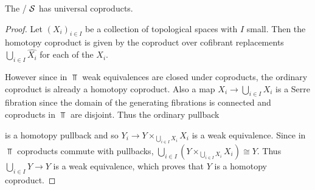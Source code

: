 \begin{lemma}
    The \inftycat/ $\mathcal{S}$ has universal coproducts.
    \begin{proof}
        	Let $\left(X_i\right)_{i\in I}$ be a collection of topological spaces with $I$ small. 
            Then the homotopy coproduct is given by the coproduct over cofibrant replacements $\bigcup\limits_{i\in I}\widehat{X_i}$ for each of the $X_i$.

            However since in $\Top$ weak equivalences are closed under coproducts, the ordinary coproduct is already a homotopy coproduct.
            Also a map $X_i\to\bigcup\limits_{i\in I} X_i$ is a Serre fibration since the domain of the generating fibrations is connected and coproducts in $\Top$ are disjoint.
            Thus the ordinary pullback
            \begin{center}
            \end{center}
            is a homotopy pullback and so $Y_i\to Y\times_{\bigcup\limits_{i\in I} X_i}X_i$ is a weak equivalence.
            Since in $\Top$ coproducts commute with pullbacks, $\bigcup\limits_{i\in I}\left(Y\times_{\bigcup\limits_{i\in I} X_i}X_i\right)\cong Y$.
            Thus $\bigcup\limits_{i\in I}Y\to Y$ is a weak equivalence, which proves that $Y$ is a homotopy coproduct.
    \end{proof}
\end{lemma}
